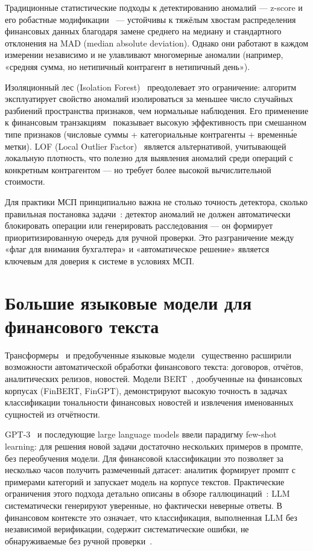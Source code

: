 Традиционные статистические подходы к детектированию аномалий --- z-score и его робастные модификации~\cite{rousseeuw1993alternatives} --- устойчивы к тяжёлым хвостам распределения финансовых данных благодаря замене среднего на медиану и стандартного отклонения на MAD (median absolute deviation). Однако они работают в каждом измерении независимо и не улавливают многомерные аномалии (например, «средняя сумма, но нетипичный контрагент в нетипичный день»).

Изоляционный лес (Isolation Forest)~\cite{liu2008isolation} преодолевает это ограничение: алгоритм эксплуатирует свойство аномалий изолироваться за меньшее число случайных разбиений пространства признаков, чем нормальные наблюдения. Его применение к финансовым транзакциям~\cite{lopezdeprado2018advances} показывает высокую эффективность при смешанном типе признаков (числовые суммы + категориальные контрагенты + временны́е метки). LOF (Local Outlier Factor)~\cite{breunig2000lof} является альтернативой, учитывающей локальную плотность, что полезно для выявления аномалий среди операций с конкретным контрагентом --- но требует более высокой вычислительной стоимости.

Для практики МСП принципиально важна не столько точность детектора, сколько правильная постановка задачи~\cite{chandola2009anomaly}: детектор аномалий не должен автоматически блокировать операции или генерировать расследования --- он формирует приоритизированную очередь для ручной проверки. Это разграничение между «флаг для внимания бухгалтера» и «автоматическое решение» является ключевым для доверия к системе в условиях МСП.

\section{Большие языковые модели для финансового текста}

Трансформеры~\cite{vaswani2017attention} и предобученные языковые модели~\cite{devlin2018bert,brown2020language} существенно расширили возможности автоматической обработки финансового текста: договоров, отчётов, аналитических релизов, новостей. Модели BERT~\cite{devlin2018bert}, дообученные на финансовых корпусах (FinBERT, FinGPT), демонстрируют высокую точность в задачах классификации тональности финансовых новостей и извлечения именованных сущностей из отчётности.

GPT-3~\cite{brown2020language} и последующие large language models ввели парадигму few-shot learning: для решения новой задачи достаточно нескольких примеров в промпте, без переобучения модели. Для финансовой классификации это позволяет за несколько часов получить размеченный датасет: аналитик формирует промпт с примерами категорий и запускает модель на корпусе текстов. Практические ограничения этого подхода детально описаны в обзоре галлюцинаций~\cite{ji2023survey}: LLM систематически генерируют уверенные, но фактически неверные ответы. В финансовом контексте это означает, что классификация, выполненная LLM без независимой верификации, содержит систематические ошибки, не обнаруживаемые без ручной проверки~\cite{ji2023survey}.

